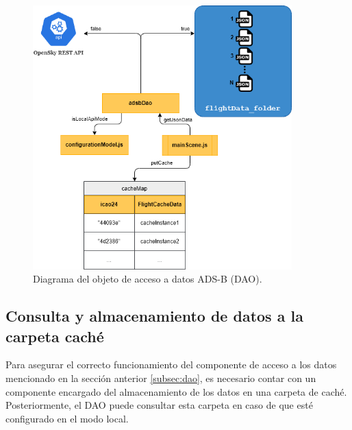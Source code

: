 \documentclass[a4paper, 11pt]{book}
\begin{document}
\begin{figure}[H]
  \centering
  \includegraphics[width=10cm, keepaspectratio]{img/adsbDao.png}
  \caption{Diagrama del objeto de acceso a datos ADS-B (DAO).}
  \label{fig:dao}
\end{figure}

\subsection{Consulta y almacenamiento de datos a la carpeta caché}
\label{subsec:obtencionCache}
Para asegurar el correcto funcionamiento del componente de acceso a los datos mencionado en la sección anterior \ref{subsec:dao}, es necesario contar con un componente encargado del almacenamiento de los datos en una carpeta de caché. Posteriormente, el DAO puede consultar esta carpeta en caso de que esté configurado en el modo local.
\end{document}
